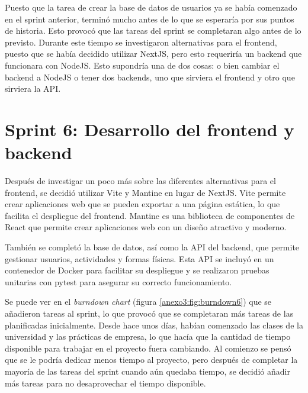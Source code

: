 Puesto que la tarea de crear la base de datos de usuarios ya se había comenzado en el sprint anterior,
terminó mucho antes de lo que se esperaría por sus puntos de historia. Esto provocó que las tareas del
sprint se completaran algo antes de lo previsto. Durante este tiempo se investigaron alternativas
para el frontend, puesto que se había decidido utilizar NextJS, pero
esto requeriría un backend que funcionara con NodeJS. Esto supondría una de dos cosas: o bien cambiar
el backend a NodeJS o tener dos backends, uno que sirviera el frontend y otro que sirviera la API.




\section{Sprint 6: Desarrollo del frontend y backend}
\label{anexo3:sec:sprint6}

Después de investigar un poco más sobre las diferentes alternativas para el frontend, se decidió
utilizar Vite y Mantine en lugar de NextJS. Vite permite crear aplicaciones web que se pueden
exportar a una página estática, lo que facilita el despliegue del frontend. Mantine es una
biblioteca de componentes de React que permite crear aplicaciones web con un diseño atractivo y
moderno.

También se completó la base de datos, así como la API del backend, que permite gestionar usuarios,
actividades y formas físicas. Esta API se incluyó en un contenedor de Docker para facilitar su despliegue y
se realizaron pruebas unitarias con pytest para asegurar su correcto funcionamiento.

Se puede ver en el \textit{burndown chart} (figura \ref{anexo3:fig:burndown6}) que se añadieron
tareas al sprint, lo que provocó que se completaran más tareas de las planificadas inicialmente.
Desde hace unos días, habían comenzado las clases de la universidad y las prácticas de empresa, lo
que hacía que la cantidad de tiempo disponible para trabajar en el proyecto fuera cambiando. Al
comienzo se pensó que se le podría dedicar menos tiempo al proyecto, pero después de completar
la mayoría de las tareas del sprint cuando aún quedaba tiempo, se decidió añadir más tareas para
no desaprovechar el tiempo disponible.

